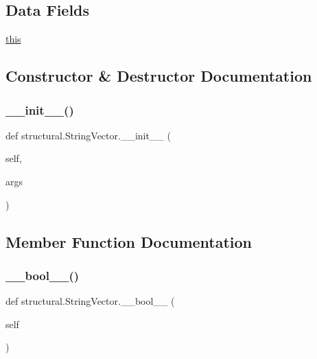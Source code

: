 \subsection*{Data Fields}
\begin{DoxyCompactItemize}
\item 
\hyperlink{classstructural_1_1_string_vector_a692fb95aad03c9f9c7109481bec65c87}{this}
\end{DoxyCompactItemize}


\subsection{Constructor \& Destructor Documentation}
\mbox{\label{classstructural_1_1_string_vector_af7de40a38181ab9f228cb209cd38fe30}} 
\subsubsection{\texorpdfstring{\+\_\+\+\_\+init\+\_\+\+\_\+()}{\_\_init\_\_()}}
{\footnotesize\ttfamily def structural.\+String\+Vector.\+\_\+\+\_\+init\+\_\+\+\_\+ (\begin{DoxyParamCaption}\item[{}]{self,  }\item[{}]{args }\end{DoxyParamCaption})}



\subsection{Member Function Documentation}
\mbox{\label{classstructural_1_1_string_vector_a2625c12fc6f916193219b42a1a974dfb}} 
\subsubsection{\texorpdfstring{\+\_\+\+\_\+bool\+\_\+\+\_\+()}{\_\_bool\_\_()}}
{\footnotesize\ttfamily def structural.\+String\+Vector.\+\_\+\+\_\+bool\+\_\+\+\_\+ (\begin{DoxyParamCaption}\item[{}]{self }\end{DoxyParamCaption})}

